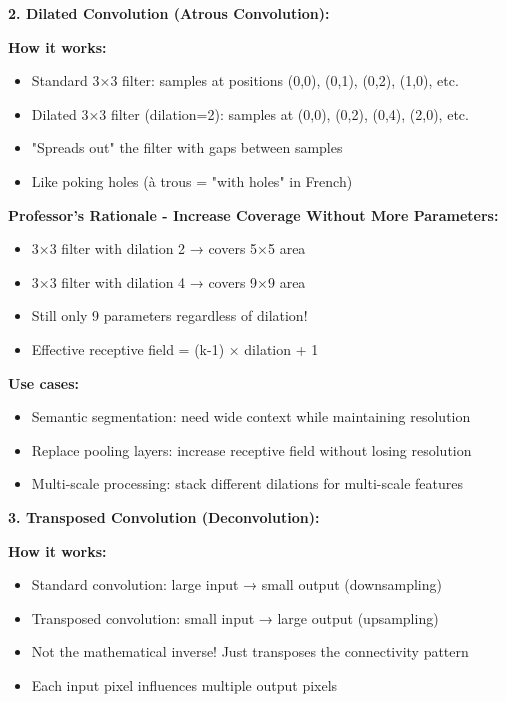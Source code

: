 \documentclass[12pt]{article}
\newcommand{\explanation}[1]{{\color{explanationcolor}#1}}
\begin{document}
\begin{enumerate}[(a)]
{    \textbf{2. Dilated Convolution (Atrous Convolution):}
    
    \explanation{
    \textbf{How it works:}
    \begin{itemize}
        \item Standard 3×3 filter: samples at positions (0,0), (0,1), (0,2), (1,0), etc.
        \item Dilated 3×3 filter (dilation=2): samples at (0,0), (0,2), (0,4), (2,0), etc.
        \item "Spreads out" the filter with gaps between samples
        \item Like poking holes (à trous = "with holes" in French)
    \end{itemize}
    
    \textbf{Professor's Rationale - Increase Coverage Without More Parameters:}
    \begin{itemize}
        \item 3×3 filter with dilation 2 → covers 5×5 area
        \item 3×3 filter with dilation 4 → covers 9×9 area
        \item Still only 9 parameters regardless of dilation!
        \item Effective receptive field = (k-1) × dilation + 1
    \end{itemize}
    
    \textbf{Use cases:}
    \begin{itemize}
        \item Semantic segmentation: need wide context while maintaining resolution
        \item Replace pooling layers: increase receptive field without losing resolution
        \item Multi-scale processing: stack different dilations for multi-scale features
    \end{itemize}
    }
    
    \textbf{3. Transposed Convolution (Deconvolution):}
    
    \explanation{
    \textbf{How it works:}
    \begin{itemize}
        \item Standard convolution: large input → small output (downsampling)
        \item Transposed convolution: small input → large output (upsampling)
        \item Not the mathematical inverse! Just transposes the connectivity pattern
        \item Each input pixel influences multiple output pixels
    \end{itemize}
    
}}
\end{enumerate}
\end{document}
